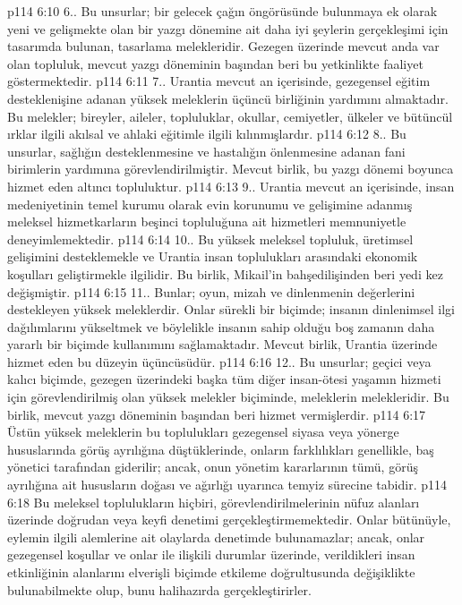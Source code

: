 \vs p114 6:10 6.\bibnobreakspace {}. Bu unsurlar; bir gelecek çağın öngörüsünde bulunmaya ek olarak yeni ve gelişmekte olan bir yazgı dönemine ait daha iyi şeylerin gerçekleşimi için tasarımda bulunan, tasarlama melekleridir. Gezegen üzerinde mevcut anda var olan topluluk, mevcut yazgı döneminin başından beri bu yetkinlikte faaliyet göstermektedir.
\vs p114 6:11 7.\bibnobreakspace {}. Urantia mevcut an içerisinde, gezegensel eğitim desteklenişine adanan yüksek meleklerin üçüncü birliğinin yardımını almaktadır. Bu melekler; bireyler, aileler, topluluklar, okullar, cemiyetler, ülkeler ve bütüncül ırklar ilgili akılsal ve ahlaki eğitimle ilgili kılınmışlardır.
\vs p114 6:12 8.\bibnobreakspace {}. Bu unsurlar, sağlığın desteklenmesine ve hastalığın önlenmesine adanan fani birimlerin yardımına görevlendirilmiştir. Mevcut birlik, bu yazgı dönemi boyunca hizmet eden altıncı topluluktur.
\vs p114 6:13 9.. Urantia mevcut an içerisinde, insan medeniyetinin temel kurumu olarak evin korunumu ve gelişimine adanmış meleksel hizmetkarların beşinci topluluğuna ait hizmetleri memnuniyetle deneyimlemektedir.
\vs p114 6:14 10.\bibnobreakspace {}. Bu yüksek meleksel topluluk, üretimsel gelişimini desteklemekle ve Urantia insan toplulukları arasındaki ekonomik koşulları geliştirmekle ilgilidir. Bu birlik, Mikail’in bahşedilişinden beri yedi kez değişmiştir.
\vs p114 6:15 11.. Bunlar; oyun, mizah ve dinlenmenin değerlerini destekleyen yüksek meleklerdir. Onlar sürekli bir biçimde; insanın dinlenimsel ilgi dağılımlarını yükseltmek ve böylelikle insanın sahip olduğu boş zamanın daha yararlı bir biçimde kullanımını sağlamaktadır. Mevcut birlik, Urantia üzerinde hizmet eden bu düzeyin üçüncüsüdür.
\vs p114 6:16 12.. Bu unsurlar; geçici veya kalıcı biçimde, gezegen üzerindeki başka tüm diğer insan\hyp{}ötesi yaşamın hizmeti için görevlendirilmiş olan yüksek melekler biçiminde, meleklerin melekleridir. Bu birlik, mevcut yazgı döneminin başından beri hizmet vermişlerdir.
\vs p114 6:17 Üstün yüksek meleklerin bu toplulukları gezegensel siyasa veya yönerge hususlarında görüş ayrılığına düştüklerinde, onların farklılıkları genellikle, baş yönetici tarafından giderilir; ancak, onun yönetim kararlarının tümü, görüş ayrılığına ait hususların doğası ve ağırlığı uyarınca temyiz sürecine tabidir.
\vs p114 6:18 Bu meleksel toplulukların hiçbiri, görevlendirilmelerinin nüfuz alanları üzerinde doğrudan veya keyfi denetimi gerçekleştirmemektedir. Onlar bütünüyle, eylemin ilgili alemlerine ait olaylarda denetimde bulunamazlar; ancak, onlar gezegensel koşullar ve onlar ile ilişkili durumlar üzerinde, verildikleri insan etkinliğinin alanlarını elverişli biçimde etkileme doğrultusunda değişiklikte bulunabilmekte olup, bunu halihazırda gerçekleştirirler.

